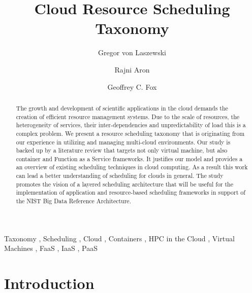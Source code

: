 \documentclass[final,5p,times,twocolumn]{elsarticle}
\begin{document}
\begin{frontmatter}

\title{Cloud Resource Scheduling Taxonomy}

\author[iu]{Gregor von Laszewski}
\address[iu]{{\small $^1$ Intelligent Systems Engineering Dep., Indiana University, Bloomington, IN 47408, USA.}}

\author[punjab]{Rajni Aron}
\address[punjab]{School of Computer Science and Engineering, Lovely Professional University, Punjab, India}


\author[iu]{Geoffrey C. Fox}


\begin{abstract}
The growth and development of scientific applications in the cloud
demands the creation of efficient resource management systems. Due to
the scale of resources, the heterogeneity of services, their
inter-dependencies and unpredictability of load this is a complex
problem. We present a resource scheduling taxonomy that is originating
from our experience in utilizing and managing multi-cloud environments. 
Our study is backed up by a literature review that
targets not only virtual machine, but also container and Function as a
Service frameworks. It justifies our model and provides a an overview
of existing scheduling techniques in cloud computing. As a result this
work can lead a better understanding of scheduling for clouds
in general. The study promotes the vision of a layered scheduling
architecture that will be useful for the implementation of application
and resource-based scheduling frameworks in support of the NIST Big
Data Reference Architecture.

\end{abstract}

\begin{keyword}
  Taxonomy \sep
  Scheduling \sep
  Cloud \sep
  Containers \sep
  HPC in the Cloud \sep
  Virtual Machines \sep
  FaaS \sep
  IaaS \sep
  PaaS
\end{keyword}

\end{frontmatter}

\section{Introduction}
\end{document}
